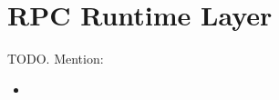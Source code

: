 \section{RPC Runtime Layer} %
\label{sec:rpc_runtime_layer}
TODO. Mention:
\begin{itemize}
	\item 
\end{itemize}
